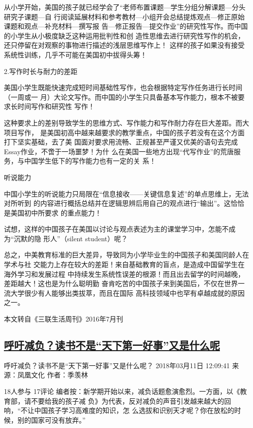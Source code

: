 \documentclass[11pt]{ctexart}
\begin{document}
{{{{从小学开始，美国的孩子就已经学会了“老师布置课题—学生分组分解课题—分头研究子课题—自
行阅读延展材料和参考教材—小组开会总结提炼观点—修正原始课题和观点—补充材料—撰写报
告—修正报告—提交作业”的研究性写作。而中国的小学生从小极度缺乏这种运用批判性和创
造性思维去进行研究性写作的机会，还只停留在对观察的事物进行描述的浅层思维写作上！
这样的孩子如果没有接受系统性训练，几乎不可能在美国初中拔得头筹！

2.写作时长与耐力的差距

美国小学生既能快速完成短时间基础性写作，也会根据特定写作任务进行长时间（一周或一
月）大论文写作。而中国的小学生只具备基本写作能力，根本不被要求长时间写作和研究性
写作！

这种要求上的差别导致学生的思维方式、写作能力和写作耐力存在巨大差距。而大项目写作，
是美国初高中越来越要求的教学重点，中国的孩子若没有在这个方面打下坚实基础，去了美
国面对要求用流畅、正规甚至严谨又优美的语句去完成Essay作业，不啻于一场噩梦！为什
么在美国一些地方出现“代写作业”的荒唐服务，与中国学生低下的写作能力也有一定的关
系！

听说能力

中国小学生的听说能力只局限在“信息接收——关键信息复述”的单点思维上，无法对所听到
的内容进行概括总结并在逻辑思辨后用自己的观点进行“输出”。这恰恰是美国初中所要求
的重点能力！

试想，这样的中国孩子在美国以讨论与观点表述为主的课堂学习中，怎能不成为“沉默的隐
形人”（silent student）呢？

总之，中美教育标准的巨大差异，导致同为小学毕业生的中国孩子和美国同龄人在学术与社
交能力上存在较大的差距！来自基础教育的盲点，是造成中国留学生在海外学习和发展过程
中持续发生系统性误差的根源！而且出去留学的时间越晚，差距越大！这也是为什么聪明勤
奋肯吃苦的中国孩子来到美国后，不仅在世界一流大学很少有人能够出类拔萃，而且在国际
高科技领域中也罕有卓越成就的原因之一。

本文转自《三联生活周刊》2016年7月刊
\subsection{\href{http://culture.ifeng.com/a/20180311/56639527\_0.shtml}{呼吁减负？读书不是“天下第一好事”又是什么呢}}
\label{sec:org6e76cf4}
呼吁减负？读书不是“天下第一好事”又是什么呢？
2018年03月11日 12:09:41
来源：凤凰文化 作者：季羡林

18人参与 17评论
编者按：新学期开始以来，减负话题愈演愈烈。一方面，以《教育部，请不要给我的孩子减
负》为代表，反对减负的声音引发越来越大的回响，“不让中国孩子学习高难度的知识，怎
么选拔和识别天才呢？你在放松的时候，别的国家可没有放弃。”

}}}}
\end{document}
